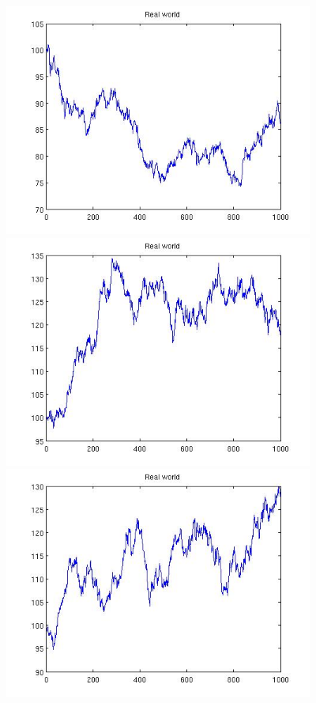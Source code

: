 \documentclass[12pt]{article}
\begin{document}
\begin{center}
    \includegraphics[width=4in]{real8.jpg}
    \includegraphics[width=4in]{real9.jpg}
    \includegraphics[width=4in]{real10.jpg}
  \end{center}
\end{document}
